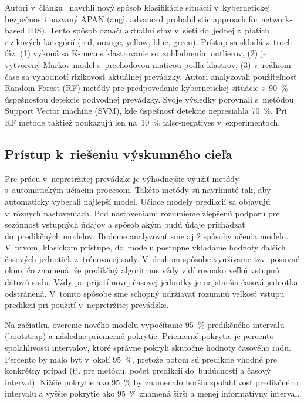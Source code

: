 \documentclass[thesismargins, thesislinespacing, openright, upjsfrontpage]{rnthesis}
\begin{document}
Autori v~článku~\cite{shin2013advanced} navrhli nový spôsob klasifikácie situácií v~kybernetickej bezpečnosti nazvaný APAN (angl. advanced probabilistic approach for network-based IDS). Tento spôsob označí aktuálni stav v~sieti do~jednej z~piatich rizikových kategórií ({red, orange, yellow, blue, green}). Prístup sa skladá z~troch fáz: (1) vykoná sa K-means klastrovanie so~zohľadnením outlierov, (2) je vytvorený Markov model s~prechodovou maticou podľa klastrov, (3) v~reálnom čase sa vyhodnotí rizikovosť aktuálnej prevádzky. Autori \cite{liu2015cloudy} analyzovali použiteľnosť Random Forest (RF) metódy pre predpovedanie kybernetickej situácie s~90~\% úspešnosťou detekcie podvodnej prevádzky. Svoje výsledky porovnali s~metódou Support Vector machine (SVM), kde úspešnosť detekcie nepresiahla 70~\%. Pri RF metóde taktiež poukazujú len na~10~\% false-negatives v~experimentoch.

\subsection{Prístup k~riešeniu výskumného cieľa}\label{c2_metodologia}

Pre prácu v~nepretržitej prevádzke je výhodnejšie využiť metódy s~automatickým učiacim procesom. Takéto metódy sú navrhnuté tak, aby automaticky vyberali najlepší model. Učiace modely predikcií sa objavujú v~rôznych nastaveniach. Pod nastaveniami rozumieme zlepšenú podporu pre sezónnosť vstupných údajov a spôsob akým budú údaje prichádzať do~predikčných modelov. Budeme analyzovať sme aj 2 spôsoby učenia modelu. V~prvom, klasickom prístupe, do~modelu postupne vkladáme hodnoty ďalších časových jednotiek z~trénovacej sady. V~druhom spôsobe využívame tzv. posuvné okno, čo znamená, že predikčný algoritmus vždy vidí rovnako veľkú vstupnú dátovú sadu. Vždy po prijatí novej časovej jednotky je najstaršia časová jednotka odstránená. V~tomto spôsobe sme schopný udržiavať rozumnú veľkosť vstupu predikcií pri použití v~nepretržitej prevádzke.

Na začiatku, overenie nového modelu vypočítame 95~\% predikčného intervalu (bootstrap) a následne priemerné pokrytie. Priemerné pokrytie je percento spoľahlivosti intervalov, ktoré správne pokryli skutočné hodnoty časového radu. Percento by malo byť v~okolí 95~\%, pretože potom sú predikcie vhodné pre konkrétny prípad (tj. pre metódu, počet predikcií do~budúcnosti a časový interval). Nižšie pokrytie ako 95~\% by znamenalo horšiu spoľahlivosť predikčného intervalu a vyššie pokrytie ako 95~\% znamená širší a menej informatívny interval.
\end{document}
